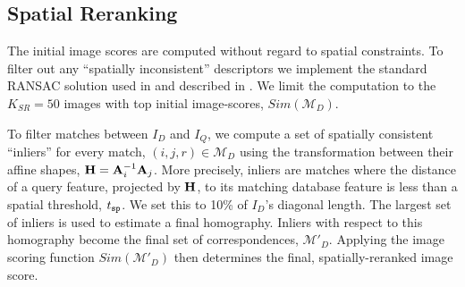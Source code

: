 \subsection {Spatial Reranking} \label{sec:rerank1}

The initial image scores are computed without regard to
spatial constraints. To filter out any ``spatially inconsistent'' descriptors we implement the
standard RANSAC solution used in \cite{cvpr07PhilbinObjRetriev} and described in \cite{accv04ChumLORANSAC}.
We limit the computation
to the $K_{SR} = 50$ images with top initial image-scores, $Sim(\mathcal{M}_D)$.


To filter matches between $I_D$ and $I_Q$, we compute a set
of spatially consistent ``inliers'' for every match,
$(i, j, r) \in \mathcal{M}_D$ using the transformation between
 their affine shapes, ${\mathbf H} = {\mathbf A}_{i}^{-1}{\mathbf A}_{j}$.
More precisely, inliers are matches where the distance of a query feature, projected by ${\mathbf H}$, to its matching database feature
 is less than a spatial threshold, $t_{\tt sp}$. We set this to 10\% of $I_D$'s diagonal length.
The largest set of inliers is used to estimate a final homography. %
Inliers with respect to this homography become the final set of correspondences,
$\mathcal{M}'_D$.  Applying the image scoring function
$Sim(\mathcal{M}'_D)$ then determines the final, spatially-reranked
image score.


%



